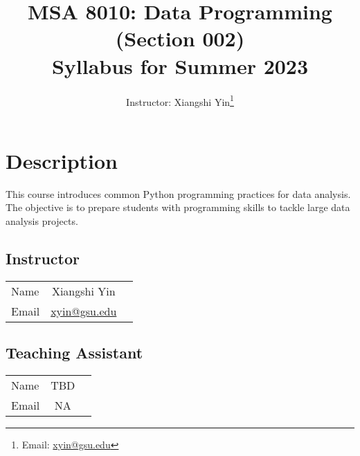 \documentclass{article}
\title{
	MSA 8010: Data Programming (Section 002)\\
	\large Syllabus for Summer 2023
}
\author{Instructor: Xiangshi Yin\thanks{Email: \href{mailto:xyin@gsu.edu}{xyin@gsu.edu}}}
\begin{document}
\maketitle

\tableofcontents


\section{Description}
This course introduces common Python programming practices for data analysis. The objective is to prepare students with programming skills to tackle large data analysis projects.


\subsection{Instructor}
\begin{center}
  \begin{tabular}{ l | c r }
    \hline			
    Name & Xiangshi Yin\\
    Email & \href{mailto:xyin@gsu.edu}{xyin@gsu.edu}\\
    \hline  
  \end{tabular}
\end{center}

\subsection{Teaching Assistant}
\begin{center}
	\begin{tabular}{ l | c r }
		\hline			
		Name & TBD\\
		Email & NA\\
		\hline  
	\end{tabular}
\end{center}
\end{document}
